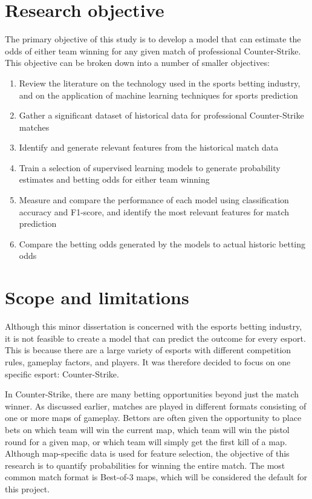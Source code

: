 \section{Research objective}

The primary objective of this study is to develop a model that can estimate the odds of either team winning for any given match of professional Counter-Strike. This objective can be broken down into a number of smaller objectives:

\begin{enumerate}
	\item Review the literature on the technology used in the sports betting industry, and on the application of machine learning techniques for sports prediction
	\item Gather a significant dataset of historical data for professional Counter-Strike matches
	\item Identify and generate relevant features from the historical match data
	\item Train a selection of supervised learning models to generate probability estimates and betting odds for either team winning
	\item Measure and compare the performance of each model using classification accuracy and F1-score, and identify the most relevant features for match prediction
	\item Compare the betting odds generated by the models to actual historic betting odds
\end{enumerate}

\section{Scope and limitations}

Although this minor dissertation is concerned with the esports betting industry, it is not feasible to create a model that can predict the outcome for every esport. This is because there are a large variety of esports with different competition rules, gameplay factors, and players. It was therefore decided to focus on one specific esport: Counter-Strike.

In Counter-Strike, there are many betting opportunities beyond just the match winner. As discussed earlier, matches are played in different formats consisting of one or more maps of gameplay. Bettors are often given the opportunity to place bets on which team will win the current map, which team will win the pistol round for a given map, or which team will simply get the first kill of a map. Although map-specific data is used for feature selection, the objective of this research is to quantify probabilities for winning the entire match. The most common match format is Best-of-3 maps, which will be considered the default for this project.

